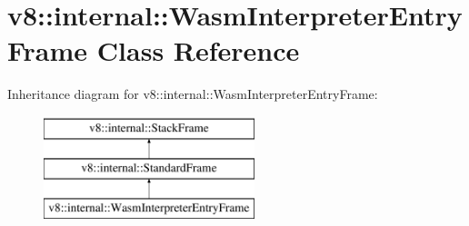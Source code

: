 \hypertarget{classv8_1_1internal_1_1WasmInterpreterEntryFrame}{}\section{v8\+:\+:internal\+:\+:Wasm\+Interpreter\+Entry\+Frame Class Reference}
\label{classv8_1_1internal_1_1WasmInterpreterEntryFrame}
Inheritance diagram for v8\+:\+:internal\+:\+:Wasm\+Interpreter\+Entry\+Frame\+:\begin{figure}[H]
\begin{center}
\leavevmode
\includegraphics[height=3.000000cm]{classv8_1_1internal_1_1WasmInterpreterEntryFrame}
\end{center}
\end{figure}
